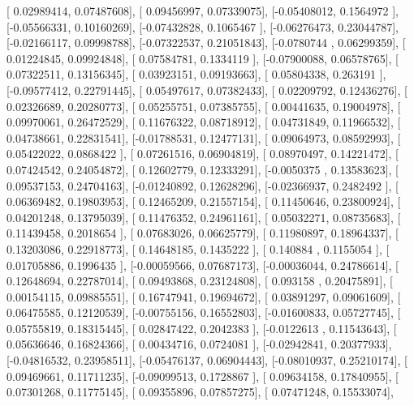 \documentclass{article}
\begin{document}
       [ 0.02989414,  0.07487608],
       [ 0.09456997,  0.07339075],
       [-0.05408012,  0.1564972 ],
       [-0.05566331,  0.10160269],
       [-0.07432828,  0.1065467 ],
       [-0.06276473,  0.23044787],
       [-0.02166117,  0.09998788],
       [-0.07322537,  0.21051843],
       [-0.0780744 ,  0.06299359],
       [ 0.01224845,  0.09924848],
       [ 0.07584781,  0.1334119 ],
       [-0.07900088,  0.06578765],
       [ 0.07322511,  0.13156345],
       [ 0.03923151,  0.09193663],
       [ 0.05804338,  0.263191  ],
       [-0.09577412,  0.22791445],
       [ 0.05497617,  0.07382433],
       [ 0.02209792,  0.12436276],
       [ 0.02326689,  0.20280773],
       [ 0.05255751,  0.07385755],
       [ 0.00441635,  0.19004978],
       [ 0.09970061,  0.26472529],
       [ 0.11676322,  0.08718912],
       [ 0.04731849,  0.11966532],
       [ 0.04738661,  0.22831541],
       [-0.01788531,  0.12477131],
       [ 0.09064973,  0.08592993],
       [ 0.05422022,  0.0868422 ],
       [ 0.07261516,  0.06904819],
       [ 0.08970497,  0.14221472],
       [ 0.07424542,  0.24054872],
       [ 0.12602779,  0.12333291],
       [-0.0050375 ,  0.13583623],
       [ 0.09537153,  0.24704163],
       [-0.01240892,  0.12628296],
       [-0.02366937,  0.2482492 ],
       [ 0.06369482,  0.19803953],
       [ 0.12465209,  0.21557154],
       [ 0.11450646,  0.23800924],
       [ 0.04201248,  0.13795039],
       [ 0.11476352,  0.24961161],
       [ 0.05032271,  0.08735683],
       [ 0.11439458,  0.2018654 ],
       [ 0.07683026,  0.06625779],
       [ 0.11980897,  0.18964337],
       [ 0.13203086,  0.22918773],
       [ 0.14648185,  0.1435222 ],
       [ 0.140884  ,  0.1155054 ],
       [ 0.01705886,  0.1996435 ],
       [-0.00059566,  0.07687173],
       [-0.00036044,  0.24786614],
       [ 0.12648694,  0.22787014],
       [ 0.09493868,  0.23124808],
       [ 0.093158  ,  0.20475891],
       [ 0.00154115,  0.09885551],
       [ 0.16747941,  0.19694672],
       [ 0.03891297,  0.09061609],
       [ 0.06475585,  0.12120539],
       [-0.00755156,  0.16552803],
       [-0.01600833,  0.05727745],
       [ 0.05755819,  0.18315445],
       [ 0.02847422,  0.2042383 ],
       [-0.0122613 ,  0.11543643],
       [ 0.05636646,  0.16824366],
       [ 0.00434716,  0.0724081 ],
       [-0.02942841,  0.20377933],
       [-0.04816532,  0.23958511],
       [-0.05476137,  0.06904443],
       [-0.08010937,  0.25210174],
       [ 0.09469661,  0.11711235],
       [-0.09099513,  0.1728867 ],
       [ 0.09634158,  0.17840955],
       [ 0.07301268,  0.11775145],
       [ 0.09355896,  0.07857275],
       [ 0.07471248,  0.15533074],
\end{document}

